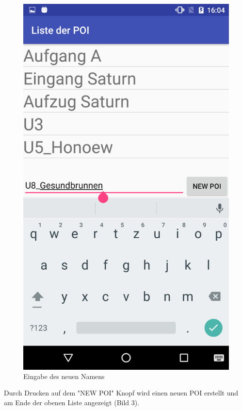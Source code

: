 \documentclass{article}
\begin{document}
\begin{figure}[H]
	\centering
	\includegraphics[scale=0.18]{images/poi_name_insert.png}
	\caption{Eingabe des neuen Namens}
	\label{fig:poi_name_insert}
\end{figure}

Durch Drucken auf dem "NEW POI" Knopf wird einen neuen POI erstellt und am Ende der obenen Liste angezeigt (Bild 3).
\end{document}
